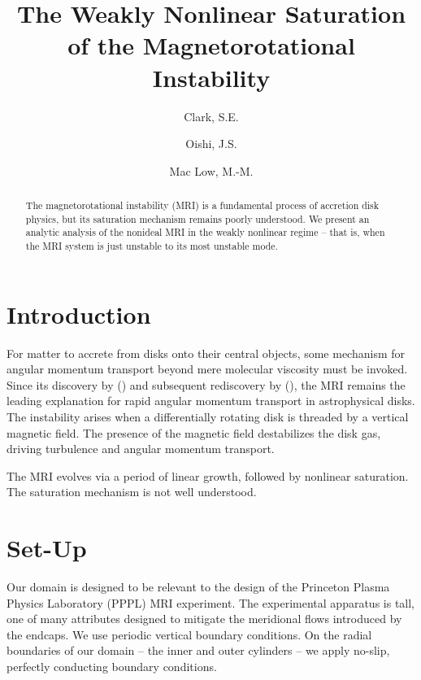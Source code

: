 \documentclass{emulateapj}
\begin{document}
\title{The Weakly Nonlinear Saturation of the Magnetorotational Instability}
\author{Clark, S.E.}
\author{Oishi, J.S. }
\author{Mac Low, M.-M.}


\begin{abstract}
The magnetorotational instability (MRI) is a fundamental process of accretion disk physics, but its saturation mechanism remains poorly understood. We present an analytic analysis of the nonideal MRI in the weakly nonlinear regime -- that is, when the MRI system is just unstable to its most unstable mode. 
\end{abstract}



\section{Introduction}

For matter to accrete from disks onto their central objects, some mechanism for angular momentum transport beyond mere molecular viscosity must be invoked. Since its discovery by \citeauthor{Chandrasekhar:1960wh} (\citeyear{Chandrasekhar:1960wh}) and subsequent rediscovery by \citeauthor{Balbus:1991vs} (\citeyear{Balbus:1991vs}), the MRI remains the leading explanation for rapid angular momentum transport in astrophysical disks. The instability arises when a differentially rotating disk is threaded by a vertical magnetic field. The presence of the magnetic field destabilizes the disk gas, driving turbulence and angular momentum transport.

The MRI evolves via a period of linear growth, followed by nonlinear saturation. The saturation mechanism is not well understood. 

\section{Set-Up}

Our domain is designed to be relevant to the design of the Princeton Plasma Physics Laboratory (PPPL) MRI experiment. The experimental apparatus is tall, one of many attributes designed to mitigate the meridional flows introduced by the endcaps. We use periodic vertical boundary conditions. On the radial boundaries of our domain --  the inner and outer cylinders -- we apply no-slip, perfectly conducting boundary conditions.
\end{document}
